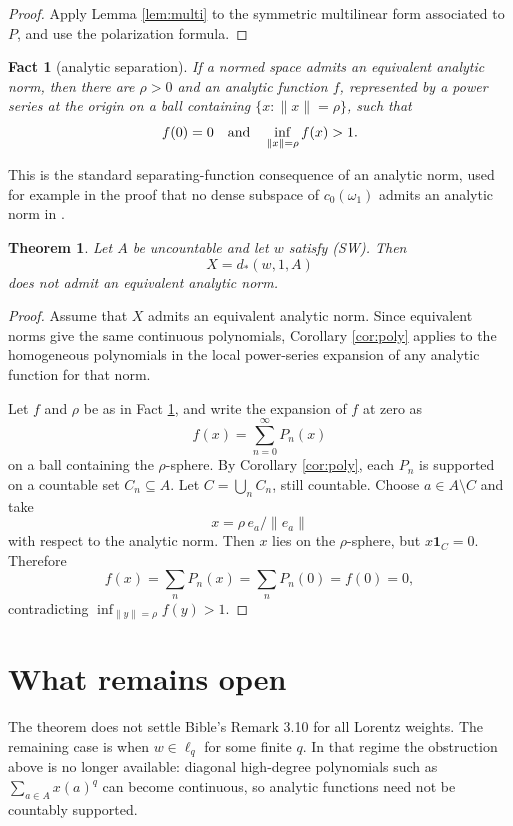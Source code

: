 \documentclass[11pt]{article}
\newtheorem{theorem}{Theorem}
\newtheorem{fact}{Fact}
\begin{document}
\begin{proof}
Apply Lemma \ref{lem:multi} to the symmetric multilinear form associated to
\(P\), and use the polarization formula.
\end{proof}

\begin{fact}[analytic separation]\label{fact:sep}
If a normed space admits an equivalent analytic norm, then there are
\(\rho>0\) and an analytic function \(f\), represented by a power series at
the origin on a ball containing \(\{x:\|x\|=\rho\}\), such that
\[
  f(0)=0
  \quad\hbox{and}\quad
  \inf_{\|x\|=\rho} f(x)>1.
\]
\end{fact}

\noindent This is the standard separating-function consequence of an analytic
norm, used for example in the proof that no dense subspace of
\(c_0(\omega_1)\) admits an analytic norm in \cite{dantas-hajek-russo}.

\begin{theorem}\label{thm:main}
Let \(A\) be uncountable and let \(w\) satisfy (SW).  Then
\[
  X=d_*(w,1,A)
\]
does not admit an equivalent analytic norm.
\end{theorem}

\begin{proof}
Assume that \(X\) admits an equivalent analytic norm.  Since equivalent norms
give the same continuous polynomials, Corollary \ref{cor:poly} applies to the
homogeneous polynomials in the local power-series expansion of any analytic
function for that norm.

Let \(f\) and \(\rho\) be as in Fact \ref{fact:sep}, and write the expansion
of \(f\) at zero as
\[
  f(x)=\sum_{n=0}^\infty P_n(x)
\]
on a ball containing the \(\rho\)-sphere.  By Corollary \ref{cor:poly}, each
\(P_n\) is supported on a countable set \(C_n\subseteq A\).  Let
\(C=\bigcup_n C_n\), still countable.  Choose \(a\in A\setminus C\) and take
\[
  x=\rho\, e_a/\|e_a\|
\]
with respect to the analytic norm.  Then \(x\) lies on the \(\rho\)-sphere,
but \(x\mathbf 1_C=0\).  Therefore
\[
  f(x)=\sum_n P_n(x)=\sum_n P_n(0)=f(0)=0,
\]
contradicting \(\inf_{\|y\|=\rho}f(y)>1\).
\end{proof}

\section{What remains open}

The theorem does not settle Bible's Remark 3.10 for all Lorentz weights.  The
remaining case is when \(w\in\ell_q\) for some finite \(q\).  In that regime
the obstruction above is no longer available: diagonal high-degree polynomials
such as \(\sum_{a\in A}x(a)^q\) can become continuous, so analytic functions
need not be countably supported.
\end{document}
